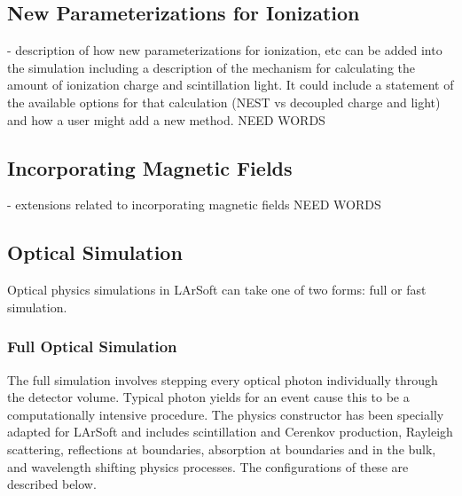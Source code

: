 \documentclass[12pt]{elsarticle}
\begin{document}
\subsection{New Parameterizations for Ionization}
\label{sec:ionization}
- description of how new parameterizations for ionization, etc can be added into the simulation including a description of the mechanism for calculating the amount of ionization charge and scintillation light.  It could include a statement of the available options for that calculation (NEST vs decoupled charge and light) and how a user might add a new method.
NEED WORDS

\subsection{Incorporating Magnetic Fields}
- extensions related to incorporating magnetic fields
NEED WORDS
\subsection{Optical Simulation}
Optical physics simulations in LArSoft can take one of two forms: full or fast 
simulation.  
\subsubsection{Full Optical Simulation}
\label{sec:fullopticalsim}
The full simulation involves stepping every optical photon individually through the detector volume.  Typical photon yields for an event cause this to be a computationally intensive procedure. The physics constructor has been specially adapted for LArSoft and includes scintillation and Cerenkov production, Rayleigh scattering, reflections at boundaries, absorption at boundaries and in the bulk, and wavelength shifting physics processes.  The configurations of these are described below.
\end{document}
